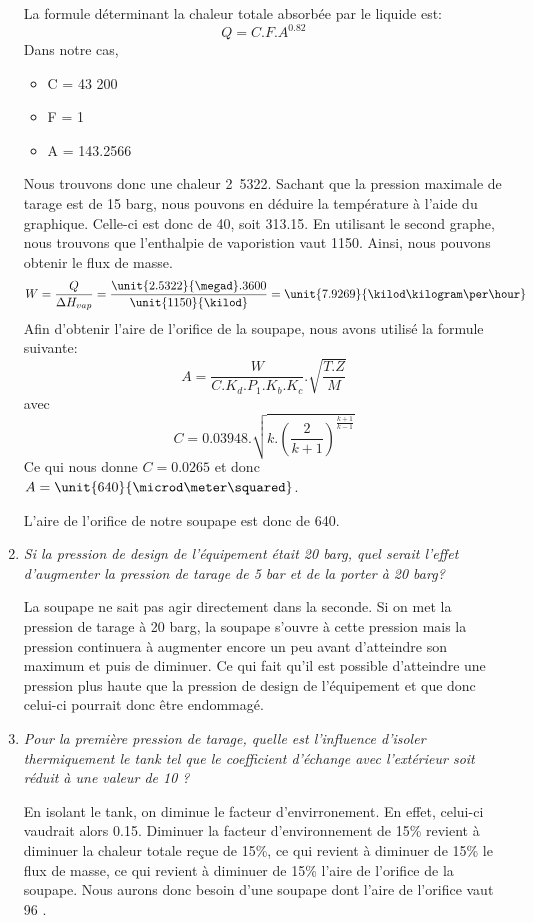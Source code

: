 \documentclass{report}
\begin{document}
\begin{enumerate}
La formule déterminant la chaleur totale absorbée par le liquide est: $$ Q = C.F.A^{0.82} $$
Dans notre cas,
\begin{itemize}
\item C = 43 200
\item F = 1
\item A = 143.2566 \meter\squared
\end{itemize}
Nous trouvons donc une chaleur \unit{2.5322}{\megad\watt}.
Sachant que la pression maximale de tarage est de 15 barg, nous pouvons en déduire la température à l'aide du graphique. Celle-ci est donc de 40\celsius, soit 313.15\kelvin. En utilisant le second graphe, nous trouvons que l'enthalpie de vaporistion vaut \unit{1150}{\kilo\joule\per\kilogram}. Ainsi, nous pouvons obtenir le flux de masse. $$ W = \frac{Q}{\Delta H_{vap}} = \frac{\unit{2.5322}{\megad}.3600}{\unit{1150}{\kilod}} = \unit{7.9269}{\kilod\kilogram\per\hour} $$
Afin d'obtenir l'aire de l'orifice de la soupape, nous avons utilisé la formule suivante:
$$ A = \frac{W}{C.K_d.P_1.K_b.K_c}.\sqrt{\frac{T.Z}{M}} $$ avec $$ C = 0.03948.\sqrt{k.(\frac{2}{k+1})^\frac{k+1}{k-1}} $$
Ce qui nous donne $ C = 0.0265$ et donc $A = \unit{640}{\microd\meter\squared}$.

L'aire de l'orifice de notre soupape est donc de \unit{640}{\microd\meter\squared}.

\item\textit{Si la pression de design de l'équipement était 20 barg, quel serait l'effet d'augmenter la pression de tarage de 5 bar et de la porter à 20 barg?}

La soupape ne sait pas agir directement dans la seconde. Si on met la pression de tarage à 20 barg, la soupape s'ouvre à cette pression mais la pression continuera à augmenter encore un peu avant d'atteindre son maximum et puis de diminuer. Ce qui fait qu'il est possible d'atteindre une pression plus haute que la pression de design de l'équipement et que donc celui-ci pourrait donc être endommagé.

\item\textit{Pour la première pression de tarage, quelle est l'influence d'isoler thermiquement le tank tel que le coefficient d'échange avec l'extérieur soit réduit à une valeur de 10 \watt\per\meter\squared\kelvin ?}

En isolant le tank, on diminue le facteur d'envirronement. En effet, celui-ci vaudrait alors 0.15. Diminuer la facteur d'environnement de 15\% revient à diminuer la chaleur totale reçue de 15\%, ce qui revient à diminuer de 15\% le flux de masse, ce qui revient à diminuer de 15\% l'aire de l'orifice de la soupape. Nous aurons donc besoin d'une soupape dont l'aire de l'orifice vaut 96 \microd\meter\squared.
\end{enumerate}
\end{document}
